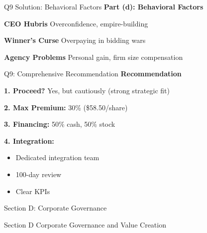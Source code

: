 \documentclass[aspectratio=169,10pt]{beamer}
\renewcommand{\small}{\fontsize{6pt}{7.5pt}\selectfont}
\renewcommand{\large}{\fontsize{8pt}{10pt}\selectfont}
\renewcommand{\Large}{\fontsize{9pt}{11pt}\selectfont}
\newcommand{\question}[1]{{\large\bfseries\color{crimson}#1}}
\begin{document}
	\begin{frame}{Q9 Solution: Behavioral Factors}
		\question{Part (d): Behavioral Factors}
		\small
		
		\textbf{CEO Hubris}
		Overconfidence, empire-building
		
		\vspace{0.1cm}
		\textbf{Winner's Curse}
		Overpaying in bidding wars
		
		\vspace{0.1cm}
		\textbf{Agency Problems}
		Personal gain, firm size compensation
	\end{frame}
	
	\begin{frame}{Q9: Comprehensive Recommendation}
		\question{Recommendation}
		\small
		
		\textbf{1. Proceed?} Yes, but cautiously (strong strategic fit)
		
		\vspace{0.1cm}
		\textbf{2. Max Premium:} 30\% (\$58.50/share)
		
		\vspace{0.1cm}
		\textbf{3. Financing:} 50\% cash, 50\% stock
		
		\vspace{0.1cm}
		\textbf{4. Integration:}
		\begin{itemize}
			\item Dedicated integration team
			\item 100-day review
			\item Clear KPIs
		\end{itemize}
	\end{frame}
	
	\begin{frame}{Section D: Corporate Governance}
		\begin{center}
			\Large\textcolor{navyblue}{Section D}
			\vspace{0.2cm}
			\large Corporate Governance and Value Creation
		\end{center}
	\end{frame}
	
\end{document}
